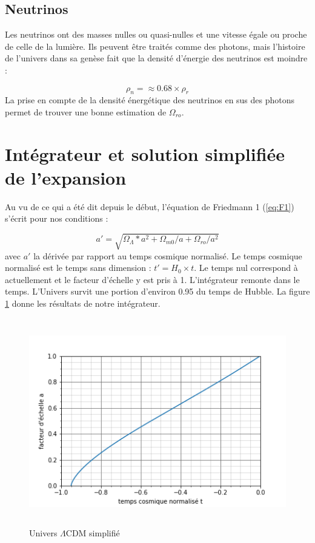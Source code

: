 \documentclass[10pt, a4paper]{report}
\numberwithin{equation}{subsection}
\begin{document}
\subsection{Neutrinos}
Les neutrinos ont des masses nulles ou quasi-nulles et une vitesse égale ou proche de celle de la lumière. Ils peuvent être traités comme des photons, mais l'histoire de l'univers dans sa genèse fait que la densité d'énergie des neutrinos est moindre :

\begin{equation} \label{eq:EDN}
\boxed{\rho_n = \approx 0.68 \times \rho_r}
\end{equation}
La prise en compte de la densité énergétique des neutrinos en sus des photons permet de trouver une bonne estimation de $\Omega_{ro}$.
\section{Intégrateur et solution simplifiée de l'expansion}
Au vu de ce qui a été dit depuis le début, l'équation de Friedmann 1 (\ref{eq:F1}) s'écrit pour nos conditions :

\begin{equation} \label{eq:ELCDM}
\boxed{a' = \sqrt{\Omega_{\Lambda}*a^2+\Omega_{m0}/a+\Omega_{ro}/a^2}}
\end{equation}
avec $a'$ la dérivée par rapport au temps cosmique normalisé. Le temps cosmique normalisé est le temps sans dimension : $t' = H_0 \times t$.  Le temps nul correspond à actuellement et le facteur d'échelle y est pris à 1. L'intégrateur remonte dans le temps. L'Univers survit une portion d'environ 0.95 du temps de Hubble. La figure \ref{fig:ULCDM} donne les résultats de notre intégrateur.

\begin{figure}[]
\centering
\includegraphics[width=12.0cm,height=9cm]{LCDMf.png}
\caption{Univers $\Lambda$CDM simplifié}
\label{fig:ULCDM}
\end{figure}
 
\end{document}
